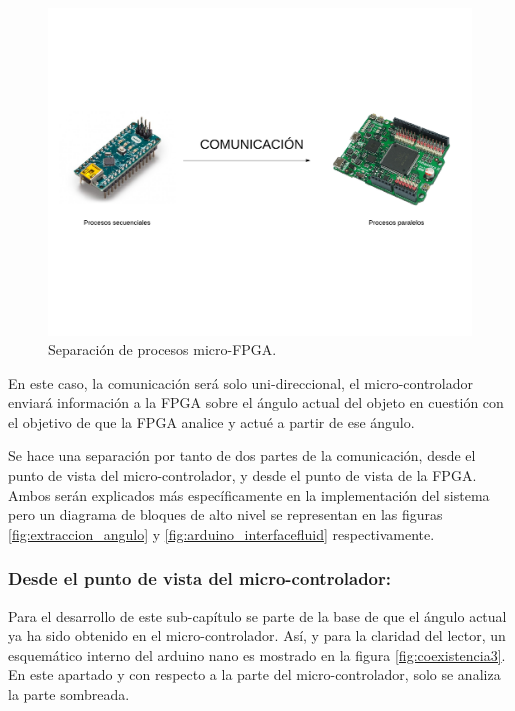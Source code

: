 \begin{figure}[H]
	\center
	\includegraphics[trim = 0mm 40mm 0mm 20mm, clip,scale=0.4]{imagenes/Balancing_robot/coexistencia1.pdf}
	\caption{Separación de procesos micro-FPGA.}
	\label{fig:coexistencia1}
\end{figure}

En este caso, la comunicación será solo uni-direccional, el micro-controlador enviará información a la FPGA sobre el ángulo actual del objeto en cuestión con el objetivo de que la FPGA analice y actué a partir de ese ángulo.\newline

Se hace una separación por tanto de dos partes de la comunicación, desde el punto de vista del micro-controlador, y desde el punto de vista de la FPGA. Ambos serán explicados más específicamente en la implementación del sistema pero un diagrama de bloques de alto nivel se representan en las figuras \ref{fig:extraccion_angulo} y \ref{fig:arduino_interfacefluid} respectivamente. 

\subsubsection{Desde el punto de vista del micro-controlador:}

Para el desarrollo de este sub-capítulo se parte de la base de que el ángulo actual ya ha sido obtenido en el micro-controlador. Así, y para la claridad del lector, un esquemático interno del arduino nano es mostrado en la figura \ref{fig:coexistencia3}. En este apartado y con respecto a la parte del micro-controlador, solo se analiza la parte sombreada.  

